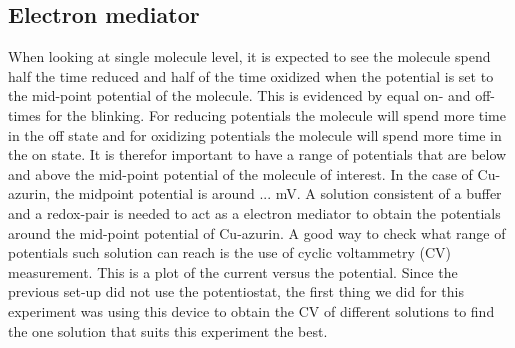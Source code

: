 \documentclass[twoside,single]{lion-msc}
\begin{document}
\subsection{Electron mediator}\label{ferriferro}
When looking at single molecule level, it is expected to see the molecule spend half the time reduced and half of the time oxidized when the potential is set to the mid-point potential of the molecule. This  is evidenced by equal on- and off-times for the blinking. For reducing potentials the molecule will spend more time in the off state and for oxidizing potentials the molecule will spend more time in the on state. It is therefor important to have a range of potentials that are below and above the mid-point potential of the molecule of interest. In the case of Cu-azurin, the midpoint potential is around ... mV. A solution consistent of a buffer and a redox-pair is needed to act as a electron mediator to obtain the potentials around the mid-point potential of Cu-azurin. A good way to check what range of potentials such solution can reach is the use of cyclic voltammetry (CV) measurement. This is a plot of the current versus the potential. Since the previous set-up did not use the potentiostat, the first thing we did for this experiment was using this device to obtain the CV of different solutions to find the one solution that suits this experiment the best.
\end{document}
